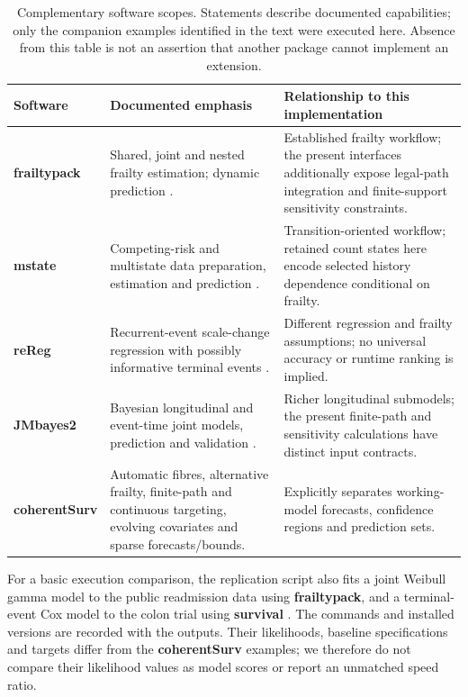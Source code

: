 \documentclass[article,nojss]{jss}
\newcommand{\pkg}[1]{\textbf{#1}}
\begin{document}
\begin{table}[tbp]\centering\small
\begin{tabular}{>{\raggedright\arraybackslash}p{}>{\raggedright\arraybackslash}p{}>{\raggedright\arraybackslash}p{}}\toprule
Software & Documented emphasis & Relationship to this implementation \\ \midrule
\pkg{frailtypack} & Shared, joint and nested frailty estimation; dynamic prediction \citep{Rondeau2012,Krol2017}. & Established frailty workflow; the present interfaces additionally expose legal-path integration and finite-support sensitivity constraints. \\ 
\pkg{mstate} & Competing-risk and multistate data preparation, estimation and prediction \citep{deWreede2011}. & Transition-oriented workflow; retained count states here encode selected history dependence conditional on frailty. \\ 
\pkg{reReg} & Recurrent-event scale-change regression with possibly informative terminal events \citep{Chiou2023}. & Different regression and frailty assumptions; no universal accuracy or runtime ranking is implied. \\ 
\pkg{JMbayes2} & Bayesian longitudinal and event-time joint models, prediction and validation \citep{JMbayes2}. & Richer longitudinal submodels; the present finite-path and sensitivity calculations have distinct input contracts. \\ 
\pkg{coherentSurv} & Automatic fibres, alternative frailty, finite-path and continuous targeting, evolving covariates and sparse forecasts/bounds. & Explicitly separates working-model forecasts, confidence regions and prediction sets. \\ 
\bottomrule\end{tabular}
\caption{Complementary software scopes. Statements describe documented capabilities; only the companion examples identified in the text were executed here. Absence from this table is not an assertion that another package cannot implement an extension.}\label{tab:related}
\end{table}


For a basic execution comparison, the replication script also fits a joint Weibull gamma model to the public readmission data using \pkg{frailtypack}, and a terminal-event Cox model to the colon trial using \pkg{survival} \citep{survival}. The commands and installed versions are recorded with the outputs. Their likelihoods, baseline specifications and targets differ from the \pkg{coherentSurv} examples; we therefore do not compare their likelihood values as model scores or report an unmatched speed ratio.
\end{document}
